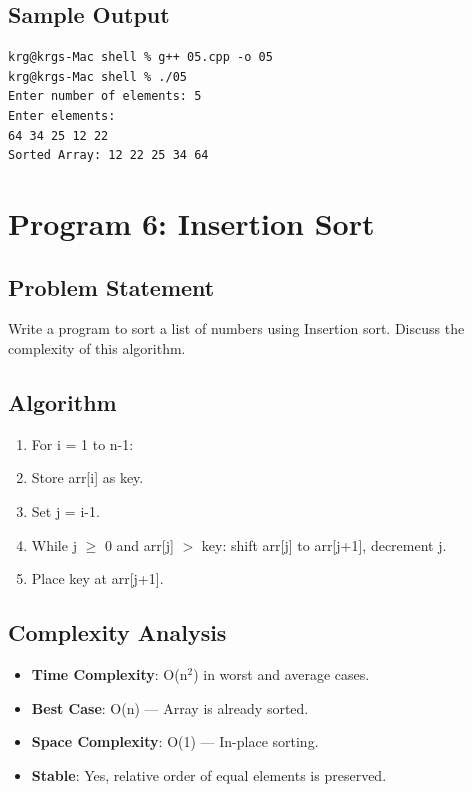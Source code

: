 \documentclass[a4paper,12pt]{article}
\begin{document}
\subsection*{Sample Output}
\begin{lstlisting}[style=outputstyle]
krg@krgs-Mac shell % g++ 05.cpp -o 05
krg@krgs-Mac shell % ./05
Enter number of elements: 5
Enter elements:
64 34 25 12 22
Sorted Array: 12 22 25 34 64
\end{lstlisting}

\newpage

\section*{Program 6: Insertion Sort}

\subsection*{Problem Statement}
Write a program to sort a list of numbers using Insertion sort. Discuss the complexity of this algorithm.

\subsection*{Algorithm}
\begin{enumerate}
    \item For i = 1 to n-1:
    \item   Store arr[i] as key.
    \item   Set j = i-1.
    \item   While j $\geq$ 0 and arr[j] $>$ key: shift arr[j] to arr[j+1], decrement j.
    \item   Place key at arr[j+1].
\end{enumerate}

\subsection*{Complexity Analysis}
\begin{itemize}
    \item \textbf{Time Complexity}: O(n$^2$) in worst and average cases.
    \item \textbf{Best Case}: O(n) — Array is already sorted.
    \item \textbf{Space Complexity}: O(1) — In-place sorting.
    \item \textbf{Stable}: Yes, relative order of equal elements is preserved.
\end{itemize}
\end{document}
